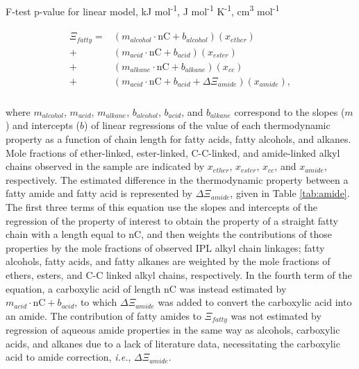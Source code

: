 {\begin{table}
\begin{threeparttable}
\begin{tablenotes}
     F-test p-value for linear model,
     kJ mol\textsuperscript{-1},
     J mol\textsuperscript{-1} K\textsuperscript{-1},
     cm\textsuperscript{3} mol\textsuperscript{-1}
    \item
        
  \end{tablenotes}
  
  \label{tab:regress_chain_prop}
  \end{threeparttable}
\end{table}
\setcounter{tabcounter}{0} %
\doublespace
\clearpage
}


\begin{align}
\begin{split}
\Xi_{fatty} = & (m_{alcohol}\cdot \text{nC} + b_{alcohol})(x_{ether}) \\
            + & (m_{acid}\cdot \text{nC} + b_{acid})(x_{ester}) \\
            + & (m_{alkane}\cdot \text{nC} + b_{alkane})(x_{cc}) \\
            + & (m_{acid}\cdot \text{nC} + b_{acid} + \Delta\Xi_{amide})(x_{amide}), \\
\end{split}
\end{align}

\noindent where $m_{alcohol}$, $m_{acid}$, $m_{alkane}$, $b_{alcohol}$, $b_{acid}$, and $b_{alkane}$ correspond to the slopes ($m$) and intercepts ($b$) of linear regressions of the value of each thermodynamic property as a function of chain length for fatty acids, fatty alcohols, and alkanes. Mole fractions of ether-linked, ester-linked, C-C-linked, and amide-linked alkyl chains observed in the sample are indicated by $x_{ether}$, $x_{ester}$, $x_{cc}$, and $x_{amide}$, respectively. The estimated difference in the thermodynamic property between a fatty amide and fatty acid is represented by $\Delta\Xi_{amide}$, given in Table \ref{tab:amide}. The first three terms of this equation use the slopes and intercepts of the regression of the property of interest to obtain the property of a straight fatty chain with a length equal to nC, and then weights the contributions of those properties by the mole fractions of observed IPL alkyl chain linkages; fatty alcohols, fatty acids, and fatty alkanes are weighted by the mole fractions of ethers, esters, and C-C linked alkyl chains, respectively. In the fourth term of the equation, a carboxylic acid of length nC was instead estimated by $m_{acid}\cdot \text{nC} + b_{acid}$, to which $\Delta\Xi_{amide}$ was added to convert the carboxylic acid into an amide. The contribution of fatty amides to $\Xi_{fatty}$ was not estimated by regression of aqueous amide properties in the same way as alcohols, carboxylic acids, and alkanes due to a lack of literature data, necessitating the carboxylic acid to amide correction, \textit{i.e.}, $\Delta\Xi_{amide}$.


